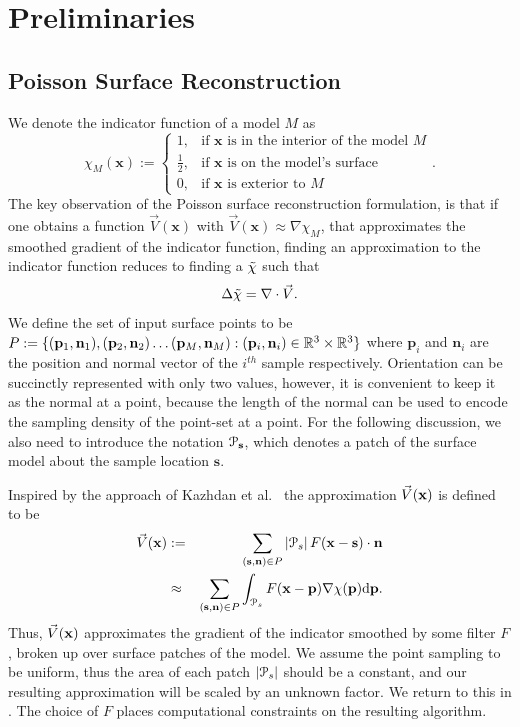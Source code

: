 \section{Preliminaries}\label{sec:pois_review}
\subsection{Poisson Surface Reconstruction}
We denote the indicator function of a model $M$ as $$ \chi_M(\mathbf{x}) :=
\begin{cases}
1, & \text{if }\mathbf{x}\text{ is in the interior of the model } M \\
\frac{1}{2}, & \text{if } \mathbf{x}\text{ is on the model's surface}\\
0, & \text{if }\mathbf{x}\text{ is exterior to } M
\end{cases}. $$
The key observation of the Poisson surface reconstruction formulation, is that if one obtains a function $\vec{V}(\mathbf{x})$ with $\vec{V}(\mathbf{x})\approx{\nabla}\chi_M$, that approximates the smoothed gradient of the indicator function, finding an approximation to the indicator function reduces to finding a $\tilde{\chi}$ such that {\small 
\begin{equation} \label{eq:poisson}
	\lapl{\inda} = {\grad} \cdot \vec{V}.
\end{equation}}
We define the set of input surface points to be $P:=\{(\mathbf{p}_1,\mathbf{n}_1), (\mathbf{p}_2,\mathbf{n}_2) \hdots (\mathbf{p}_M,\mathbf{n}_M) : (\mathbf{p}_i,\mathbf{n}_i) \in
\mathbb{R}^3 \times \mathbb{R}^3 \}$ where $\mathbf{p}_i$ and $\mathbf{n}_i$ are the position and normal vector of the $i^{th}$ sample respectively. Orientation can be succinctly represented with only two values, however, it is convenient to keep it as the normal at a point, because the length of the normal can be used to encode the sampling density of the point-set at a point. For the following discussion, we also need to introduce the notation $\mathcal{P}_{\mathbf{s}}$, which denotes a patch of the surface model about the sample location $\mathbf{s}$. 

Inspired by the approach of Kazhdan et al.~\cite{Kazhdan06} the approximation $\vec{V}(\mathbf{x})$ is defined to be  {\small 
\begin{eqnarray}
	\vec{V}(\vx) & := & \sum_{(\mathbf{s},\mathbf{n}) \in P}\left|\patch_s\right|F(\vx-\mathbf{s})\cdot\vn \label{eq:vdef} \\
	 & \approx & \sum_{(\mathbf{s},\mathbf{n}) \in P} \int_{\patch_s}{F(\mathbf{x} - \mathbf{p}) \nabla \chi (\mathbf{p})} \mathrm{d} \mathbf{p}. \notag  
\end{eqnarray}}
Thus, $\vec{V}(\mathbf{x})$ approximates the gradient of the indicator smoothed by some filter $F$, broken up over surface patches of the model. We assume the point sampling to be uniform, thus the area of each patch $\left|\mathcal{P}_s\right|$ should be a constant, and our resulting approximation will be scaled by an unknown factor. We return to this in . The choice of $F$ places computational constraints on the resulting algorithm.

